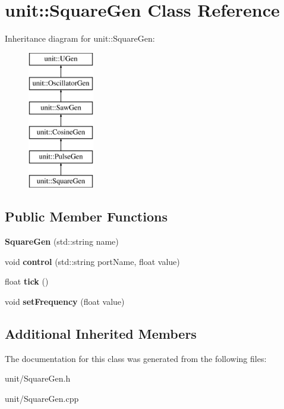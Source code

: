 \hypertarget{classunit_1_1SquareGen}{}\section{unit\+:\+:Square\+Gen Class Reference}
\label{classunit_1_1SquareGen}
Inheritance diagram for unit\+:\+:Square\+Gen\+:\begin{figure}[H]
\begin{center}
\leavevmode
\includegraphics[height=6.000000cm]{classunit_1_1SquareGen}
\end{center}
\end{figure}
\subsection*{Public Member Functions}
\begin{DoxyCompactItemize}
\item 
{\bfseries Square\+Gen} (std\+::string name)\hypertarget{classunit_1_1SquareGen_a626505e8ade08b9383acda8901aa23b5}{}\label{classunit_1_1SquareGen_a626505e8ade08b9383acda8901aa23b5}

\item 
void {\bfseries control} (std\+::string port\+Name, float value)\hypertarget{classunit_1_1SquareGen_a8a25dc2b8c5d1ec7857e4da7ec96cecc}{}\label{classunit_1_1SquareGen_a8a25dc2b8c5d1ec7857e4da7ec96cecc}

\item 
float {\bfseries tick} ()\hypertarget{classunit_1_1SquareGen_a119ab47582ee5814687b87db6a71644c}{}\label{classunit_1_1SquareGen_a119ab47582ee5814687b87db6a71644c}

\item 
void {\bfseries set\+Frequency} (float value)\hypertarget{classunit_1_1SquareGen_a437dde2e640bc9267d937ae3058777de}{}\label{classunit_1_1SquareGen_a437dde2e640bc9267d937ae3058777de}

\end{DoxyCompactItemize}
\subsection*{Additional Inherited Members}


The documentation for this class was generated from the following files\+:\begin{DoxyCompactItemize}
\item 
unit/Square\+Gen.\+h\item 
unit/Square\+Gen.\+cpp\end{DoxyCompactItemize}
